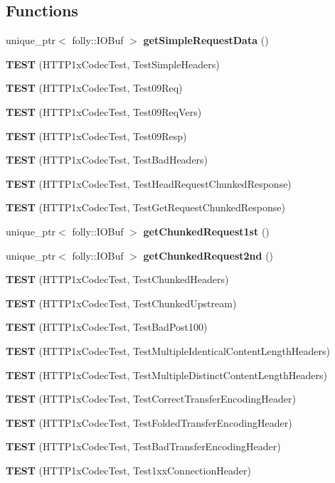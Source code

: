 \subsection*{Functions}
\begin{DoxyCompactItemize}
\item 
unique\+\_\+ptr$<$ folly\+::\+I\+O\+Buf $>$ {\bf get\+Simple\+Request\+Data} ()
\item 
{\bf T\+E\+ST} (H\+T\+T\+P1x\+Codec\+Test, Test\+Simple\+Headers)
\item 
{\bf T\+E\+ST} (H\+T\+T\+P1x\+Codec\+Test, Test09\+Req)
\item 
{\bf T\+E\+ST} (H\+T\+T\+P1x\+Codec\+Test, Test09\+Req\+Vers)
\item 
{\bf T\+E\+ST} (H\+T\+T\+P1x\+Codec\+Test, Test09\+Resp)
\item 
{\bf T\+E\+ST} (H\+T\+T\+P1x\+Codec\+Test, Test\+Bad\+Headers)
\item 
{\bf T\+E\+ST} (H\+T\+T\+P1x\+Codec\+Test, Test\+Head\+Request\+Chunked\+Response)
\item 
{\bf T\+E\+ST} (H\+T\+T\+P1x\+Codec\+Test, Test\+Get\+Request\+Chunked\+Response)
\item 
unique\+\_\+ptr$<$ folly\+::\+I\+O\+Buf $>$ {\bf get\+Chunked\+Request1st} ()
\item 
unique\+\_\+ptr$<$ folly\+::\+I\+O\+Buf $>$ {\bf get\+Chunked\+Request2nd} ()
\item 
{\bf T\+E\+ST} (H\+T\+T\+P1x\+Codec\+Test, Test\+Chunked\+Headers)
\item 
{\bf T\+E\+ST} (H\+T\+T\+P1x\+Codec\+Test, Test\+Chunked\+Upstream)
\item 
{\bf T\+E\+ST} (H\+T\+T\+P1x\+Codec\+Test, Test\+Bad\+Post100)
\item 
{\bf T\+E\+ST} (H\+T\+T\+P1x\+Codec\+Test, Test\+Multiple\+Identical\+Content\+Length\+Headers)
\item 
{\bf T\+E\+ST} (H\+T\+T\+P1x\+Codec\+Test, Test\+Multiple\+Distinct\+Content\+Length\+Headers)
\item 
{\bf T\+E\+ST} (H\+T\+T\+P1x\+Codec\+Test, Test\+Correct\+Transfer\+Encoding\+Header)
\item 
{\bf T\+E\+ST} (H\+T\+T\+P1x\+Codec\+Test, Test\+Folded\+Transfer\+Encoding\+Header)
\item 
{\bf T\+E\+ST} (H\+T\+T\+P1x\+Codec\+Test, Test\+Bad\+Transfer\+Encoding\+Header)
\item 
{\bf T\+E\+ST} (H\+T\+T\+P1x\+Codec\+Test, Test1xx\+Connection\+Header)
\item 

\end{DoxyCompactItemize}
